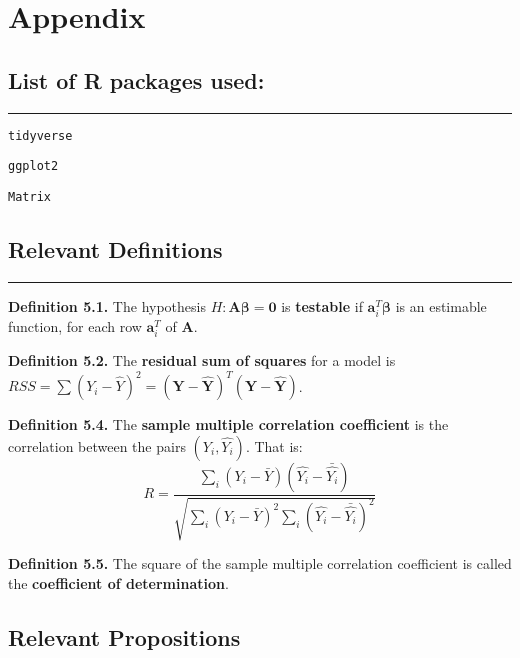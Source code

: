 \documentclass[
]{article}
\newcommand{\bmA}{\ensuremath{\bm A}}
\newcommand{\bma}{\ensuremath{\bm a}}
\newcommand{\bmY}{\ensuremath{\bm Y}}
\newcommand{\bmbeta}{\ensuremath{\bm{\beta}}}
\begin{document}
\newpage

\hypertarget{appendix}{%
\section{Appendix}\label{appendix}}

\hypertarget{list-of-r-packages-used}{%
\subsection{List of R packages used:}\label{list-of-r-packages-used}}

\begin{center}\rule{0.5\linewidth}{0.5pt}\end{center}

\texttt{tidyverse}

\texttt{ggplot2}

\texttt{Matrix}

\hypertarget{relevant-definitions}{%
\subsection{Relevant Definitions}\label{relevant-definitions}}

\begin{center}\rule{0.5\linewidth}{0.5pt}\end{center}

\textbf{Definition 5.1.} The hypothesis \(H: \bmA\bmbeta = \bm0\) is
\textbf{testable} if \(\bma_i^T\bmbeta\) is an estimable function, for
each row \(\bma_i^T\) of \(\bmA\).

\textbf{Definition 5.2.} The \textbf{residual sum of squares} for a
model is
\(RSS = \sum(Y_i-\hat{Y})^2 = (\bmY - \hat{\bmY})^T(\bmY - \hat{\bmY})\).

\textbf{Definition 5.4.} The \textbf{sample multiple correlation
coefficient} is the correlation between the pairs \((Y_i,\hat{Y_i})\).
That is: \[
R = \frac{\sum_i (Y_i - \bar{Y})(\hat{Y_i} - \bar{\hat{Y_i}})}{\sqrt{\sum_i (Y_i - \bar{Y})^2 \sum_i (\hat{Y_i} - \bar{\hat{Y_i}})^2}}
\]

\textbf{Definition 5.5.} The square of the sample multiple correlation
coefficient is called the \textbf{coefficient of determination}.

\hypertarget{relevant-propositions}{%
\subsection{Relevant Propositions}\label{relevant-propositions}}
\end{document}
